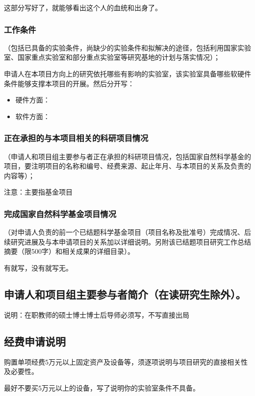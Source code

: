 这部分写好了，就能够看出这个人的血统和出身了。


\subsubsection{工作条件}
（包括已具备的实验条件，尚缺少的实验条件和拟解决的途径，包括利用国家实验室、国家重点实验室和部分重点实验室等研究基地的计划与落实情况）；

申请人在本项目方向上的研究依托哪些有影响的实验室，该实验室具备哪些软硬件条件能够支撑本项目的开展。然后分开写：
\begin{itemize}
\item 硬件方面：
\item 软件方面：
\end{itemize}



\subsubsection{正在承担的与本项目相关的科研项目情况}
（申请人和项目组主要参与者正在承担的科研项目情况，包括国家自然科学基金的项目，要注明项目的名称和编号、经费来源、起止年月、与本项目的关系及负责的内容等）；

注意：主要指基金项目



\subsubsection{完成国家自然科学基金项目情况}
（对申请人负责的前一个已结题科学基金项目（项目名称及批准号）完成情况、后续研究进展及与本申请项目的关系加以详细说明。另附该已结题项目研究工作总结摘要（限500字）和相关成果的详细目录）。

有就写，没有就写无。



\subsection{申请人和项目组主要参与者简介（在读研究生除外）。}
说明：在职教师的硕士博士博士后导师必须写，不写直接出局



\subsection{经费申请说明}
购置单项经费5万元以上固定资产及设备等，须逐项说明与项目研究的直接相关性及必要性。

最好不要买5万元以上的设备，写了说明你的实验室条件不具备。



